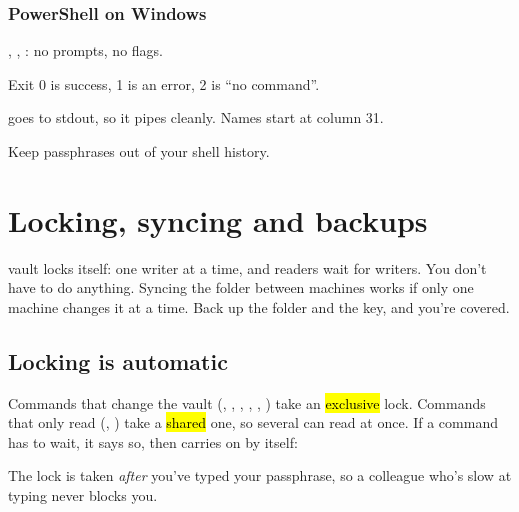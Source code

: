 \documentclass[10pt,oneside,openany]{book}
\begin{document}
\subsection{PowerShell on Windows}

\begin{pocket}
\begin{pocketlist}
  \item {}, , : no prompts, no flags.
  \item Exit 0 is success, 1 is an error, 2 is ``no command''.
  \item {} goes to stdout, so it pipes cleanly. Names start at column 31.
  \item Keep passphrases out of your shell history.
\end{pocketlist}
\end{pocket}

\chapter{Locking, syncing and backups}

\begin{tldr}
vault locks itself: one writer at a time, and readers wait for writers. You
don't have to do anything. Syncing the folder between machines works if only
one machine changes it at a time. Back up the folder and the key, and you're
covered.
\end{tldr}

\section{Locking is automatic}

Commands that change the vault (, , ,
, , ) take an
\hl{exclusive} lock. Commands that only read (, ) take a
\hl{shared} one, so several can read at once. If a command has to wait, it
says so, then carries on by itself:


The lock is taken \emph{after} you've typed your passphrase, so a colleague
who's slow at typing never blocks you.
\end{document}

